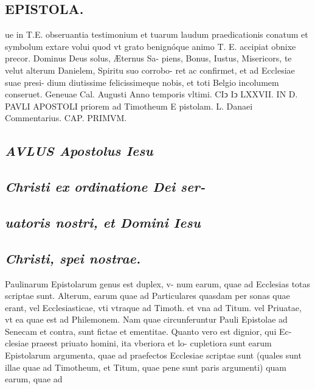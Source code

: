 \documentclass{article}
\begin{document}
\begin{pages}
\section*{EPISTOLA. }ue in T.E. obseruantia testimonium et tuarum laudum praedicationis conatum et symbolum extare volui quod vt grato benignóque animo T. E. accipiat obnixe precor. Dominus Deus solus, Æternus Sa- piens, Bonus, Iustus, Misericors, te velut alterum Danielem, Spiritu suo corrobo- ret ac confirmet, et ad Ecclesiae suae presi- dium diutissime felicissimeque nobis, et toti Belgio incolumem conseruet. Geneuae Cal. Augusti Anno temporis vltimi. CIↄ Iↄ LXXVII. IN D. PAVLI APOSTOLI priorem ad Timotheum E pistolam. L. Danaei Commentarius. CAP. PRIMVM. 
{}
\subsection*{\textit{AVLUS Apostolus Iesu}} 
{}
\subsection*{\textit{Christi ex ordinatione Dei ser-}} 
{}
\subsection*{\textit{uatoris nostri, et Domini Iesu}} 
{}
\subsection*{\textit{Christi, spei nostrae.}} Paulinarum Epistolarum genus est duplex, v- num earum, quae ad Ecclesias totas scriptae sunt. Alterum, earum quae ad Particulares quasdam per sonas quae erant, vel Ecclesiasticae, vti vtraque ad Timoth. et vna ad Titum. vel Priuatae, vt ea quae est ad Philemonem. Nam quae circunferuntur Pauli Epistolae ad Senecam et contra, sunt fictae et ementitae. Quanto vero est dignior, qui Ec- clesiae praeest priuato homini, ita vberiora et lo- cupletiora sunt earum Epistolarum argumenta, quae ad praefectos Ecclesiae scriptae sunt (quales sunt illae quae ad Timotheum, et Titum, quae pene sunt paris argumenti) quam earum, quae ad 
\textbf{}

\end{pages}
\end{document}
